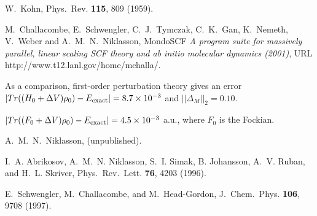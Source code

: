 \documentclass[prl,aps,twocolumn,showpacs,twocolumngrid,superbib]{revtex4}
\begin{document}
\begin{references}
 W.\ Kohn,
Phys.\ Rev. {\bf 115}, 809 (1959).

 M.\ Challacombe, E.\ Schwengler, C.\ J.\ Tymczak,
C.\ K.\ Gan, K.\ Nemeth, V.\ Weber and A.\ M.\ N.\ Niklasson, {\sc MondoSCF}
{\it A program suite for massively parallel, linear scaling SCF theory and
ab initio molecular dynamics (2001)}, URL http://www.t12.lanl.gov/home/mchalla/.

 As a comparison, first-order perturbation theory 
gives an error $|Tr((H_0+\Delta V)\rho_0)-E_{\rm exact}| = 8.7 \times 10^{-3}$ and
$||\Delta_M ||_2 = 0.10$.

 $|Tr((F_0+\Delta V)\rho_0)-E_{\rm exact}| = 4.5 \times 10^{-3}$ a.u.,
where $F_0$ is the Fockian.

 A.\ M.\ N.\ Niklasson, (unpublished).

 I.\ A. Abrikosov, A.\ M.\ N. Niklasson, S.\ I. Simak,
B. Johansson, A.\ V. Ruban, and H.\ L. Skriver,
Phys.\ Rev.\ Lett. {\bf 76}, 4203 (1996).


 E.\ Schwengler, M.\ Challacombe, and M.\ Head-Gordon,
J.\ Chem.\ Phys. {\bf 106}, 9708 (1997).

\end{references}
\end{document}
